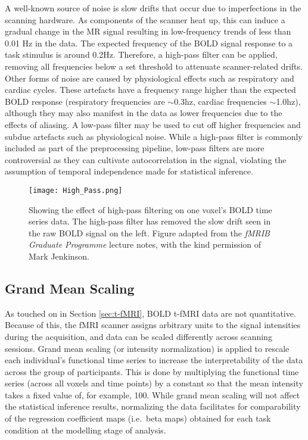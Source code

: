 A well-known source of noise is slow drifts that occur due to imperfections in the scanning hardware. As components of the scanner heat up, this can induce a gradual change in the MR signal resulting in low-frequency trends of less than 0.01 Hz in the data. The expected frequency of the BOLD signal response to a task stimulus is around 0.2Hz. Therefore, a high-pass filter can be applied, removing all frequencies below a set threshold to attenuate scanner-related drifts. Other forms of noise are caused by physiological effects such as respiratory and cardiac cycles. These artefacts have a frequency range higher than the expected BOLD response (respiratory frequencies are $\sim$0.3hz, cardiac frequencies $\sim$1.0hz), although they may also manifest in the data as lower frequencies due to the effects of aliasing. A low-pass filter may be used to cut off higher frequencies and subdue artefacts such as physiological noise. While a high-pass filter is commonly included as part of the preprocessing pipeline, low-pass filters are more controversial as they can cultivate autocorrelation in the signal, violating the assumption of temporal independence made for statistical inference. 

\begin{figure}[!ht]
\centering
	\texttt{[image: High\_Pass.png]}
\caption{Showing the effect of high-pass filtering on one voxel's BOLD time series data. The high-pass filter has removed the slow drift seen in the raw BOLD signal on the left. Figure adapted from the \textit{fMRIB Graduate Programme} lecture notes, with the kind permission of Mark Jenkinson.}
\label{fig:High_Pass}
\end{figure}

\subsection{Grand Mean Scaling}

As touched on in Section \ref{sec:t-fMRI}, BOLD t-fMRI data are not quantitative. Because of this, the fMRI scanner assigns arbitrary units to the signal intensities during the acquisition, and data can be scaled differently across scanning sessions. Grand mean scaling (or intensity normalization) is applied to rescale each individual's functional time series to increase the interpretability of the data across the group of participants. This is done by multiplying the functional time series (across all voxels and time points) by a constant so that the mean intensity takes a fixed value of, for example, 100. While grand mean scaling will not affect the statistical inference results, normalizing the data facilitates for comparability of the regression coefficient maps (i.e.\ beta maps) obtained for each task condition at the modelling stage of analysis.  

